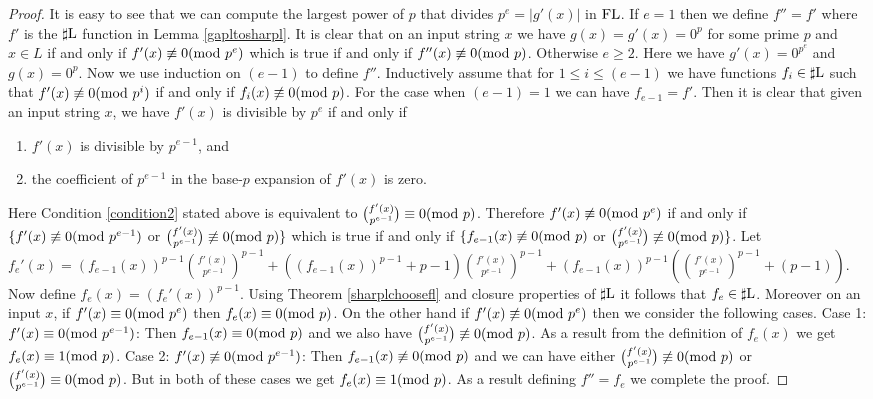 \documentclass{amsbook}
\theoremstyle{definition}
\theoremstyle{remark}
\numberwithin{section}{chapter}
\numberwithin{equation}{chapter}
\newcommand{\sharpL}{\mbox{$\sharp$\rm L}}
\newcommand{\FL}{\mbox{\rm FL}}
\renewcommand{\mod}{\mbox{\textrm mod~}}
\begin{document}
\begin{proof}
  It is easy to see that we can compute the largest power of $p$ that
  divides $p^e=|g'(x)|$ in $\FL$. If $e=1$ then we define $f''=f'$
  where $f'$ is the $\sharpL$ function in Lemma \ref{gapltosharpl}. It
  is clear that on an input string $x$ we have $g(x)=g'(x)=0^p$ for
  some prime $p$ and $x\in L$ if and only if $f'(x)\not \equiv 0(\mod
  p^e)$ which is true if and only if $f''(x)\not \equiv 0(\mod p)$. Otherwise $e\geq 2$. Here we have $g'(x)=0^{p^e}$ and $g(x)=0^p$. Now we use induction on
  $(e-1)$ to define $f''$. Inductively assume that for $1\leq i\leq
  (e-1)$ we have functions $f_i\in \sharpL$ such that $f'(x)\not
  \equiv 0(\mod p^i)$ if and only if $f_i(x)\not \equiv 0(\mod
  p)$. For the case when $(e-1)=1$ we can have $f_{e-1}=f'$. Then it
  is clear that given an input string $x$, we have $f'(x)$ is
  divisible by $p^e$ if and only if
  \begin{enumerate}
  \item $f'(x)$ is divisible by $p^{e-1}$, and
  \item \label{condition2}the coefficient of $p^{e-1}$ in the base-$p$
    expansion of $f'(x)$ is zero.
  \end{enumerate}
  Here Condition \ref{condition2} stated above is equivalent to
  ${{f'(x)}\choose{p^{e-1}}}\equiv 0(\mod p)$. Therefore $f'(x)\not \equiv 0(\mod p^e)$ if and only if
  $\{ f'(x)\not \equiv 0(\mod p^{e-1})$ or
  ${{f'(x)}\choose{p^{e-1}}}\not \equiv 0(\mod p)\}$ which is true if
  and only if $\{ f_{e-1}(x)\not \equiv 0(\mod p)$ or
  ${{f'(x)}\choose{p^{e-1}}}\not \equiv 0(\mod p)\}$. Let $f_e'(x)=(f_{e-1}(x))^{p-1}{{f'(x)}\choose{p^{e-1}}}^{p-1}+((f_{e-1}(x))^{p-1}+p-1){{f'(x)}\choose{p^{e-1}}}^{p-1}+(f_{e-1}(x))^{p-1}({{f'(x)}\choose{p^{e-1}}}^{p-1}+(p-1))$. Now define $f_e(x)=(f_e'(x))^{p-1}$. Using
  Theorem \ref{sharplchoosefl} and closure properties of $\sharpL$ it
  follows that $f_e\in \sharpL$. Moreover on an input $x$, if $f'(x)\equiv 0(\mod p^e)$ then $f_e(x)\equiv 0(\mod p)$. On the other hand if $f'(x)\not\equiv 0(\mod p^e)$ then we consider the following cases. Case 1: $f'(x)\equiv 0(\mod p^{e-1})$: Then $f_{e-1}(x)\equiv 0(\mod p)$ and we also have ${{f'(x)}\choose{p^{e-1}}}\not\equiv 0(\mod p)$. As a result from the definition of $f_e(x)$ we get $f_e(x)\equiv 1(\mod p)$.\newline
Case 2: $f'(x)\not\equiv 0(\mod p^{e-1})$: Then $f_{e-1}(x)\not \equiv 0(\mod p)$ and we can have either ${{f'(x)}\choose{p^{e-1}}}\not\equiv 0(\mod p)$ or ${{f'(x)}\choose{p^{e-1}}}\equiv 0(\mod p)$. But in both of these cases we get $f_e(x)\equiv 1(\mod p)$. As a result defining $f''=f_e$ we complete the proof.
\end{proof}
\end{document}
